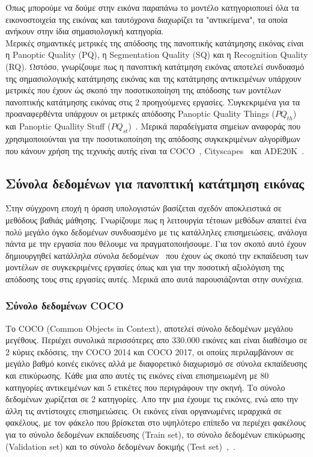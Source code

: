 \documentclass[12pt]{article}
\numberwithin{equation}{section}
\begin{document}
Όπως μπορούμε να δούμε στην εικόνα παραπάνω το μοντέλο κατηγοριοποιεί όλα τα εικονοστοιχεία της εικόνας και ταυτόχρονα διαχωρίζει τα "αντικείμενα", τα οποία ανήκουν στην ίδια σημασιολογική κατηγορία. \\

Μερικές σημαντικές μετρικές της απόδοσης της πανοπτικής κατάτμησης εικόνας είναι η Panoptic Quality (PQ), η Segmentation Quality (SQ) και η Recognition Quality (RQ). Ωστόσο, γνωρίζουμε πως η πανοπτική κατάτμηση εικόνας αποτελεί συνδυασμό της σημασιολογικής κατάτμησης εικόνας και της κατάτμησης αντικειμένων υπάρχουν μετρικές που έχουν ώς σκοπό την ποσοτικοποίηση της απόδοσης των μοντέλων πανοπτικής κατάτμησης εικόνας στις 2 προηγούμενες εργασίες. Συγκεκριμένα για τα προαναφερθέντα υπάρχουν οι μετρικές απόδοσης Panoptic Quality Things (\(PQ_{th}\)) και Panoptic Quallity Stuff (\(PQ_{st}\))~\cite{elharrouss2021panopticsegmentationreview}. Μερικά παραδείγματα σημείων αναφοράς που χρησιμοποιούνται για την ποσοτικοποίηση της απόδοσης συγκεκριμένων αλγορίθμων που κάνουν χρήση της τεχνικής αυτής είναι τα COCO~\cite{lin2015microsoftcococommonobjects}, Cityscapes~\cite{DBLP:journals/corr/CordtsORREBFRS16} και ADE20K~\cite{8100027}.

\subsection{Σύνολα δεδομένων για πανοπτική κατάτμηση εικόνας}

Στην σύγχρονη εποχή η όραση υπολογιστών βασίζεται σχεδόν αποκλειστικά σε μεθόδους βαθιάς μάθησης. Γνωρίζουμε πως η λειτουργία τέτοιων μεθόδων απαιτεί ένα πολύ μεγάλο όγκο δεδομένων συνδυασμένο με τις κατάλληλες επισημειώσεις, ανάλογα πάντα με την εργασία που θέλουμε να πραγματοποιήσουμε. Για τον σκοπό αυτό έχουν δημιουργηθεί κατάλληλα σύνολα δεδομένων~\cite{article2} που έχουν ώς σκοπό την εκπαίδευση των μοντέλων σε συγκεκριμένες εργασίες όπως και για την ποσοτική αξιολόγιση της απόδοσης τους στις εργασίες αυτές. Μερικά απο αυτά παρουσιάζονται στην συνέχεια.

\subsubsection{Σύνολο δεδομένων COCO}

Το COCO (Common Objects in Context), αποτελεί σύνολο δεδομένων μεγάλου μεγέθους. Περιέχει συνολικά περισσότερες απο 330.000 εικόνες και είναι διαθέσιμο σε 2 κύριες εκδόσεις, την COCO 2014 και COCO 2017, οι οποίες περιλαμβάνουν σε μεγάλο βαθμό κοινές εικόνες αλλά με διαφορετικό διαχωρισμό σε σύνολα εκπαίδευσης και επικύρωσης. Κάθε μια απο αυτές τις εικόνες είναι επισημειωμένη με 80 κατηγορίες αντικειμένων και 5 ετικέτες που περιγράφουν την σκηνή. Το σύνολο δεδομένων χωρίζεται σε 2 κατηγορίες. Απο την μια έχουμε τις εικόνες, ενώ απο την άλλη τις αντίστοιχες επισημειώσεις. Οι εικόνες είναι  οργανωμένες ιεραρχικά σε φακέλους, με τον φάκελο που βρίσκεται στο υψηλότερο επίπεδο να περιέχει φακέλους για το σύνολο δεδομένων εκπαίδευσης (Train set), το σύνολο δεδομένων επικύρωσης (Validation set) και το σύνολο δεδομένων δοκιμής (Test set)~\cite{lin2015microsoftcococommonobjects},~\cite{shah2023coco}.  \\
\end{document}
